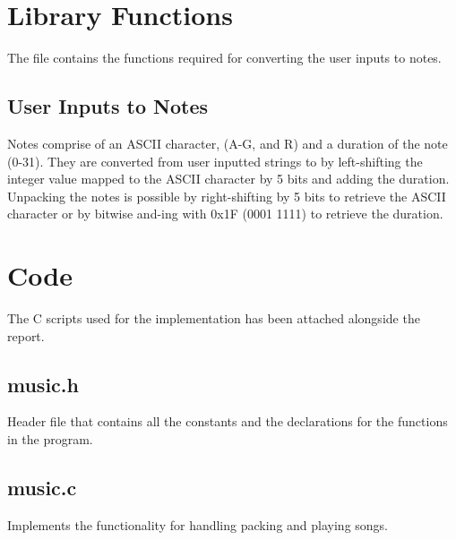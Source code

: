 \documentclass[usletter, 12pt]{article}
\begin{document}
    \section{Library Functions}

    The  file contains the functions required for converting the user inputs to notes.

        \subsection{User Inputs to Notes}

        Notes comprise of an ASCII character, (A-G, and R) and a duration of the note (0-31). They are converted from user inputted strings to  by left-shifting the integer value mapped to the ASCII character by 5 bits and adding the duration. \\
        Unpacking the notes is possible by right-shifting by 5 bits to retrieve the ASCII character or by bitwise and-ing with 0x1F (0001 1111) to retrieve the duration.

    \section{Code}

        The C scripts used for the implementation has been attached alongside the report.

        \subsection{music.h}
        Header file that contains all the constants and the declarations for the functions in the program.

        \subsection{music.c}
        Implements the functionality for handling packing and playing songs.
\end{document}
